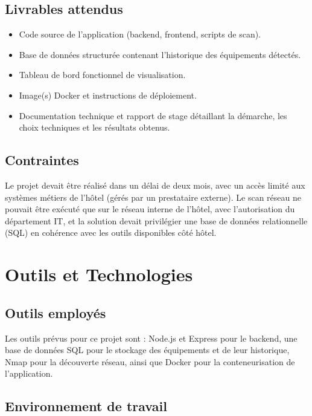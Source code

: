 \subsection{Livrables attendus}

\begin{itemize}[leftmargin=1.2cm]
    \item Code source de l'application (backend, frontend, scripts de scan).
    \item Base de données structurée contenant l'historique des équipements détectés.
    \item Tableau de bord fonctionnel de visualisation.
    \item Image(s) Docker et instructions de déploiement.
    \item Documentation technique et rapport de stage détaillant la démarche, les choix
    techniques et les résultats obtenus.
\end{itemize}

\subsection{Contraintes}

Le projet devait être réalisé dans un délai de deux mois, avec un accès limité aux
systèmes métiers de l'hôtel (gérés par un prestataire externe). Le scan réseau ne
pouvait être exécuté que sur le réseau interne de l'hôtel, avec l'autorisation du
département IT, et la solution devait privilégier une base de données relationnelle
(SQL) en cohérence avec les outils disponibles côté hôtel.

\section{Outils et Technologies}

\subsection{Outils employés}

Les outils prévus pour ce projet sont : Node.js et Express pour le backend, une base de
données SQL pour le stockage des équipements et de leur historique, Nmap pour la
découverte réseau, ainsi que Docker pour la conteneurisation de l'application.

\subsection{Environnement de travail}

